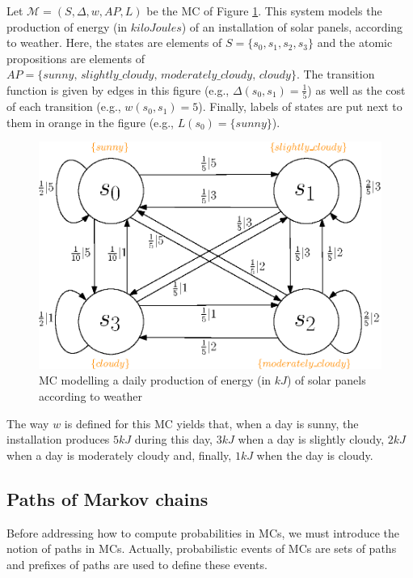 \begin{example}\label{solar-panel}
  Let $\mathcal{M} = (S, \Delta, w, AP, L)$ be the MC of Figure \ref{MCexample}. This system models the production of energy (in $kilo Joules$) of
  an installation of solar panels, according to weather.
  Here, the states are elements of $S = \{s_0, s_1, s_2, s_3\}$ and the atomic propositions are elements of $AP = \{sunny, \, slightly\_cloudy, \, moderately\_cloudy, \, cloudy \}$. The transition function is given by edges in this figure (e.g., $\Delta(s_0, s_1) = \frac{1}{5}$) as well as the
  cost of each transition (e.g., $w(s_0, s_1) = 5$). Finally, labels of states
  are put next to them in orange in the figure (e.g., $L(s_0) = \{sunny\}$).
  \begin{figure}[h!]
    \centering
    \captionsetup{justification=centering}
    \includegraphics[width=0.6\linewidth]{resources/weather-solar-pannel}
    \caption{MC modelling a daily production of energy (in $kJ$) of solar panels according to weather}
    \label{MCexample}
  \end{figure}
  The way $w$ is defined for this MC yields that, when a day is sunny, the installation produces $5 kJ$ during this day, $3 kJ$ when a day is slightly cloudy, $2 kJ$ when a day is moderately cloudy and, finally, $1 kJ$ when the day is cloudy.
\end{example}

\subsection{Paths of Markov chains}
Before addressing how to compute probabilities in MCs, we must introduce the notion of paths in MCs. Actually, probabilistic events of MCs are sets of paths and prefixes of paths are used to define these events.

